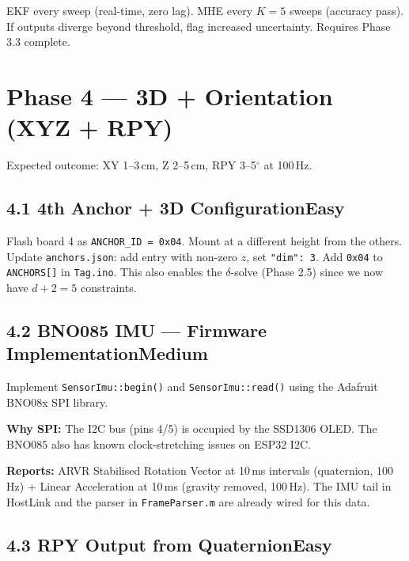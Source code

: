 \documentclass[11pt,a4paper]{article}
\newcommand{\dif}[1]{\texorpdfstring{\hfill#1}{}}
\newcommand{\easy}{\textcolor{dkgreen}{\textbf{Easy}}}
\newcommand{\medium}{\textcolor{dkorange}{\textbf{Medium}}}
\begin{document}
EKF every sweep (real-time, zero lag). MHE every $K=5$ sweeps (accuracy pass). If outputs diverge beyond threshold, flag increased uncertainty. Requires Phase 3.3 complete.

\section{Phase 4 --- 3D + Orientation (XYZ + RPY)}

\begin{phasebox}
Expected outcome: XY 1--3\,cm, Z 2--5\,cm, RPY 3--5$^\circ$ at 100\,Hz.
\end{phasebox}

\subsection{4.1 4th Anchor + 3D Configuration\dif{\easy}}

Flash board 4 as \texttt{ANCHOR\_ID = 0x04}. Mount at a different height from the others. Update \texttt{anchors.json}: add entry with non-zero $z$, set \texttt{"dim": 3}. Add \texttt{0x04} to \texttt{ANCHORS[]} in \texttt{Tag.ino}. This also enables the $\delta$-solve (Phase 2.5) since we now have $d+2 = 5$ constraints.

\subsection{4.2 BNO085 IMU --- Firmware Implementation\dif{\medium}}

Implement \texttt{SensorImu::begin()} and \texttt{SensorImu::read()} using the Adafruit BNO08x SPI library.

\textbf{Why SPI:} The I2C bus (pins 4/5) is occupied by the SSD1306 OLED. The BNO085 also has known clock-stretching issues on ESP32 I2C.

\textbf{Reports:} ARVR Stabilised Rotation Vector at 10\,ms intervals (quaternion, 100\,Hz) + Linear Acceleration at 10\,ms (gravity removed, 100\,Hz). The IMU tail in HostLink and the parser in \texttt{FrameParser.m} are already wired for this data.

\subsection{4.3 RPY Output from Quaternion\dif{\easy}}
\end{document}
